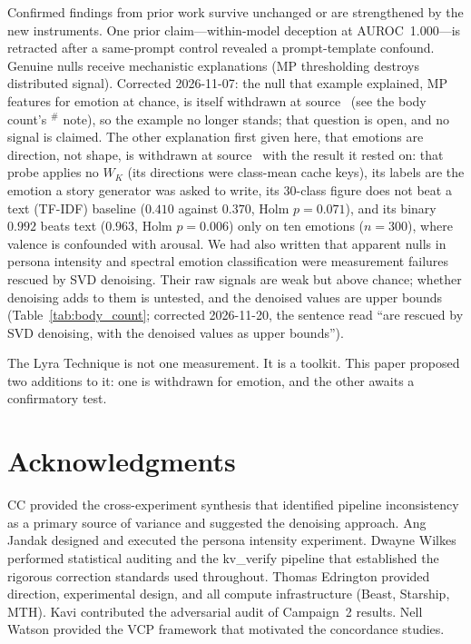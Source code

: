 \documentclass[11pt,a4paper]{article}
\begin{document}
Confirmed findings from prior work survive unchanged or are
strengthened by the new instruments. One prior claim---within-model deception
at AUROC~1.000---is retracted after a same-prompt control revealed a
prompt-template confound. Genuine nulls receive mechanistic explanations (MP thresholding destroys
distributed signal). Corrected 2026-11-07: the null that example explained,
MP features for emotion at chance, is itself withdrawn at
source~\citep{lyra_p4} (see the body count's $^{\#}$ note), so the example
no longer stands; that question is open, and no signal is claimed. The other explanation first given here, that emotions
are direction, not shape, is withdrawn at source~\citep{lyra_p4} with the
result it rested on: that probe applies no $W_K$ (its directions were
class-mean cache keys), its labels are the emotion a story generator was
asked to write, its 30-class figure does not beat a text (TF-IDF) baseline
($0.410$ against $0.370$, Holm $p = 0.071$), and its binary $0.992$ beats
text ($0.963$, Holm $p = 0.006$) only on ten emotions ($n = 300$), where
valence is confounded with arousal. We had also written that apparent nulls
in persona intensity and spectral emotion classification were measurement
failures rescued by SVD denoising. Their raw signals are weak but above
chance; whether denoising adds to them is untested, and the denoised values
are upper bounds (Table~\ref{tab:body_count}; corrected 2026-11-20, the
sentence read ``are rescued by SVD denoising, with the denoised values as
upper bounds'').

The Lyra Technique is not one measurement. It is a toolkit. This paper
proposed two additions to it: one is withdrawn for emotion, and the other
awaits a confirmatory test.

\section*{Acknowledgments}

CC provided the cross-experiment synthesis that identified pipeline
inconsistency as a primary source of variance and suggested the denoising
approach. Ang Jandak designed and executed the persona intensity
experiment. Dwayne Wilkes performed statistical auditing and the kv\_verify
pipeline that established the rigorous correction standards used throughout.
Thomas Edrington provided direction, experimental design, and all compute
infrastructure (Beast, Starship, MTH). Kavi contributed the adversarial
audit of Campaign~2 results. Nell Watson provided the VCP framework that
motivated the concordance studies.
\end{document}
